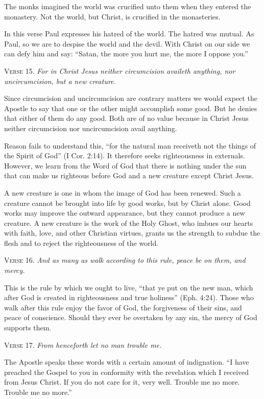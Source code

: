 The monks imagined the world was crucified unto them when they entered the monastery. Not the world, but Christ, is crucified in the monasteries.

In this verse Paul expresses his hatred of the world. The hatred was mutual. As Paul, so we are to despise the world and the devil. With Christ on our side we can defy him and say: “Satan, the more you hurt me, the more I oppose you.”

\textsc{Verse} 15. \emph{For in Christ Jesus neither circumcision availeth anything, nor uncircumcision, but a new creature.}

Since circumcision and uncircumcision are contrary matters we would expect the Apostle to say that one or the other might accomplish some good. But he denies that either of them do any good. Both are of no value because in Christ Jesus neither circumcision nor uncircumcision avail anything.

Reason fails to understand this, “for the natural man receiveth not the things of the Spirit of God” (I Cor. 2:14). It therefore seeks righteousness in externals. However, we learn from the Word of God that there is nothing under the sun that can make us righteous before God and a new creature except Christ Jesus.

A new creature is one in whom the image of God has been renewed. Such a creature cannot be brought into life by good works, but by Christ alone. Good works may improve the outward appearance, but they cannot produce a new creature. A new creature is the work of the Holy Ghost, who imbues our hearts with faith, love, and other Christian virtues, grants us the strength to subdue the flesh and to reject the righteousness of the world.

\textsc{Verse} 16. \emph{And as many as walk according to this rule, peace be on them, and mercy.}

This is the rule by which we ought to live, “that ye put on the new man, which after God is created in righteousness and true holiness” (Eph. 4:24). Those who walk after this rule enjoy the favor of God, the forgiveness of their sins, and peace of conscience. Should they ever be overtaken by any sin, the mercy of God supports them.

\textsc{Verse} 17. \emph{From henceforth let no man trouble me.}

The Apostle speaks these words with a certain amount of indignation. “I have preached the Gospel to you in conformity with the revelation which I received from Jesus Christ. If you do not care for it, very well. Trouble me no more. Trouble me no more.”

